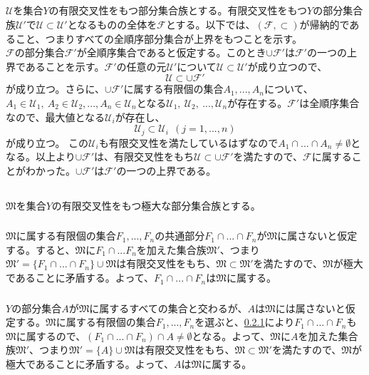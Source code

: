\documentclass{jsarticle}
\begin{document}
\subsection{}
$\mathcal{U}$を集合$Y$の有限交叉性をもつ部分集合族とする。有限交叉性をもつ$Y$の部分集合族$\mathcal{U}'$で$\mathcal{U}\subset\mathcal{U}'$となるものの全体を$\mathcal{F}$とする。以下では、$(\mathcal{F},\subset)$が帰納的であること、つまりすべての全順序部分集合が上界をもつことを示す。\\
$\mathcal{F}$の部分集合$\mathcal{F}'$が全順序集合であると仮定する。このとき$\cup\mathcal{F}'$は$\mathcal{F}'$の一つの上界であることを示す。$\mathcal{F}'$の任意の元$\mathcal{U}'$について$\mathcal{U}\subset\mathcal{U}'$が成り立つので、
\[\mathcal{U}\subset\cup\mathcal{F}'\]
が成り立つ。さらに、$\cup\mathcal{F}'$に属する有限個の集合$A_1,...,A_n$について、$A_1\in\mathcal{U}_1,\  A_2\in\mathcal{U}_2,...,A_n\in\mathcal{U}_n$となる$\mathcal{U}_1,\ \mathcal{U}_2,\ ...,\mathcal{U}_n$が存在する。$\mathcal{F}'$は全順序集合なので、最大値となる$\mathcal{U}_i$が存在し、
\[\mathcal{U}_j\subset\mathcal{U}_i\ \ (j=1,...,n)\]
が成り立つ。
この$\mathcal{U}_i$も有限交叉性を満たしているはずなので$A_1\cap...\cap A_n\neq \emptyset$となる。以上より$\cup\mathcal{F}'$は、有限交叉性をもち$\mathcal{U}\subset\cup\mathcal{F}'$を満たすので、$\mathcal{F}$に属することがわかった。$\cup\mathcal{F}'$は$\mathcal{F}'$の一つの上界である。



\subsection{}
$\mathfrak{M}$を集合$Y$の有限交叉性をもつ極大な部分集合族とする。

\subsubsection{}
\label{sec:23.3.1}
$\mathfrak{M}$に属する有限個の集合$F_1,...,F_n$の共通部分$F_1\cap...\cap F_n$が$\mathfrak{M}$に属さないと仮定する。すると、$\mathfrak{M}$に$F_1 \cap... F_n$を加えた集合族$\mathfrak{M}'$、つまり$\mathfrak{M}'=\{F_1\cap...\cap F_n\}\cup\mathfrak{M}$は有限交叉性をもち、$\mathfrak{M}\subset\mathfrak{M}'$を満たすので、$\mathfrak{M}$が極大であることに矛盾する。よって、$F_1\cap...\cap F_n$は$\mathfrak{M}$に属する。

\subsubsection{}
$Y$の部分集合$A$が$\mathfrak{M}$に属するすべての集合と交わるが、$A$は$\mathfrak{M}$には属さないと仮定する。$\mathfrak{M}$に属する有限個の集合$F_1,...,F_n$を選ぶと、\ref{sec:23.3.1}により$F_1\cap...\cap F_n$も$\mathfrak{M}$に属するので、$(F_1\cap...\cap F_n)\cap A\neq\emptyset$となる。よって、$\mathfrak{M}$に$A$を加えた集合族$\mathfrak{M}'$、つまり$\mathfrak{M}'=\{A\}\cup\mathfrak{M}$は有限交叉性をもち、$\mathfrak{M}\subset\mathfrak{M}'$を満たすので、$\mathfrak{M}$が極大であることに矛盾する。よって、$A$は$\mathfrak{M}$に属する。
\end{document}
